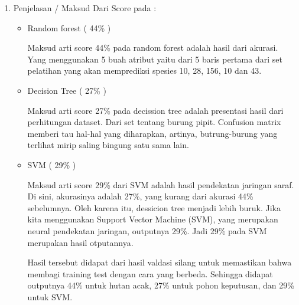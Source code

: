 \begin{enumerate}
\begin{itemize}
\par
\end{itemize}
\item Penjelasan / Maksud Dari Score pada :
\begin{itemize}
\item Random forest ( 44\% )
\par Maksud arti score 44\%  pada random forest adalah hasil dari akurasi. Yang menggunakan 5 buah atribut yaitu dari 5 baris pertama dari set pelatihan yang akan memprediksi spesies 10, 28, 156, 10 dan 43.
\par

\item Decision Tree ( 27\% )
\par Maksud arti score 27\% pada decission tree adalah presentasi hasil dari perhitungan dataset. Dari set tentang burung pipit. Confusion matrix memberi tau hal-hal yang diharapkan, artinya, butrung-burung yang terlihat mirip saling bingung satu sama lain. 
\par

\item SVM ( 29\% )
\par Maksud arti score 29\% dari SVM adalah hasil pendekatan jaringan saraf. Di sini, akurasinya adalah 27\%, yang kurang dari akurasi 44\% sebelumnya. Oleh karena itu, dessicion tree menjadi  lebih buruk. Jika kita menggunakan Support Vector Machine (SVM), yang merupakan neural pendekatan jaringan, outputnya 29\%. Jadi 29\% pada SVM merupakan hasil otputannya.
\par
\par Hasil tersebut didapat dari hasil valdasi silang untuk memastikan bahwa membagi training test dengan cara yang berbeda. Sehingga didapat outputnya 44\% untuk hutan acak, 27\% untuk pohon keputusan, dan 29\% untuk SVM.
\par
\end{itemize}


\end{enumerate}
